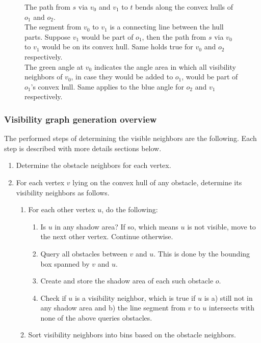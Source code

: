 \begin{figure}[h]
\begin{figcenter}
					\end{figcenter}
					\caption{The path from $s$ via $v_0$ and $v_1$ to $t$ bends along the convex hulls of $o_1$ and $o_2$.
						\\
						The segment from $v_0$ to $v_1$ is a connecting line between the hull parts. Suppose $v_1$ would be part of $o_1$, then the path from $s$ via $v_0$ to $v_1$ would be on its convex hull. Same holds true for $v_0$ and $o_2$ respectively.
						\\
						The green angle at $v_0$ indicates the angle area in which all visibility neighbors of $v_0$, in case they would be added to $o_1$, would be part of $o_1$'s convex hull. Same applies to the blue angle for $o_2$ and $v_1$ respectively.}
					\label{fig:convex-hull}
				\end{figure}				
			
			\subsubsection{Visibility graph generation overview}
			
				The performed steps of determining the visible neighbors are the following.
				Each step is described with more details sections below.
				\begin{enumerate}
					\item Determine the obstacle neighbors for each vertex.
					\item For each vertex $v$ lying on the convex hull of any obstacle, determine its visibility neighbors as follows.
					\begin{enumerate}
						\item For each other vertex $u$, do the following:
						\begin{enumerate}
							\item Is $u$ in any shadow area? If so, which means $u$ is not visible, move to the next other vertex. Continue otherwise.
							\item Query all obstacles between $v$ and $u$. This is done by the bounding box spanned by $v$ and $u$.
							\item Create and store the shadow area of each such obstacle $o$.
							\item Check if $u$ is a visibility neighbor, which is true if $u$ is a) still not in any shadow area and b) the line segment from $v$ to $u$ intersects with none of the above queries obstacles.
						\end{enumerate}
						\item Sort visibility neighbors into bins based on the obstacle neighbors.
					\end{enumerate}
				\end{enumerate}
			
